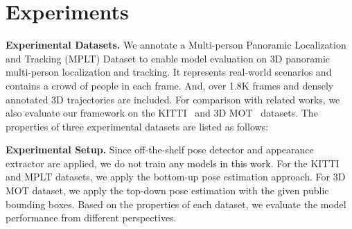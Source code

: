 \documentclass{article}
\newcommand{\YangProof}[1]{\textcolor{black}{#1}}
\begin{document}
\vspace{-7px}
\section{Experiments}
\label{sec:exp}


\noindent \textbf{Experimental Datasets.}
We annotate a Multi-person Panoramic Localization and Tracking (MPLT) Dataset to enable model evaluation on 3D panoramic multi-person localization and tracking. It represents real-world scenarios and contains a crowd of people in each frame. And, over 1.8K frames and densely annotated 3D trajectories are included. For comparison with related works, we also evaluate our framework on the KITTI~\cite{Geiger2012CVPR} and 3D MOT~\cite{andriluka2010monocular} datasets. The properties of three experimental datasets are listed as follows:
\vspace{-17px}
\begin{table}[!h]
\centering
\caption{Properties of experimental datasets.}
\end{table}

\noindent \textbf{Experimental Setup.}
Since off-the-shelf pose detector and appearance extractor are applied, we do not train any \YangProof{models in this work}. For the KITTI and MPLT datasets, we apply the bottom-up pose estimation approach. For 3D MOT dataset, we apply the top-down pose estimation with the given public bounding boxes. Based on the properties of each dataset, we evaluate the model performance from different perspectives. 
\end{document}

